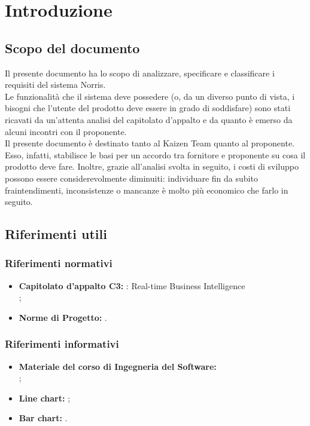 \section{Introduzione}

	\subsection{Scopo del documento}
		Il presente documento ha lo scopo di analizzare, specificare e classificare i requisiti del sistema Norris.\\
		Le funzionalità che il sistema deve possedere (o, da un diverso punto di vista, i bisogni che l'utente del prodotto deve essere in grado di soddisfare) sono stati ricavati da un'attenta analisi del capitolato d'appalto e da quanto è emerso da alcuni incontri con il proponente.\\
		Il presente documento è destinato tanto al Kaizen Team quanto al proponente. Esso, infatti, stabilisce le basi per un accordo tra fornitore e proponente su cosa il prodotto deve fare. Inoltre, grazie all'analisi svolta in seguito, i costi di sviluppo possono essere considerevolmente diminuiti: individuare fin da subito fraintendimenti, inconsistenze o mancanze è molto più economico che farlo in seguito.
	
	

	\subsection{Riferimenti utili}
		\subsubsection{Riferimenti normativi}
		\begin{itemize}
			\item\textbf{Capitolato d'appalto C3:} \projectname{}: Real-time Business Intelligence \\
				;
			\item \textbf{Norme di Progetto:} .
		\end{itemize}
		\subsubsection{Riferimenti informativi}
		\begin{itemize}
			\item \textbf{Materiale del corso di Ingegneria del Software:} \\
				;
			\item \textbf{Line chart:} ;
			\item \textbf{Bar chart:} .
		\end{itemize}
